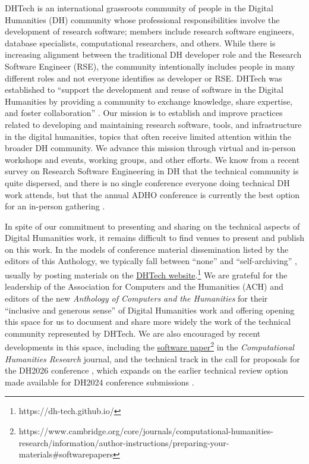 \documentclass[final]{anthology-ch} %
\begin{document}
DHTech is an international grassroots community of people in the Digital Humanities (DH) community whose professional responsibilities involve the development of research software; members include research software engineers, database specialists, computational  researchers, and others.  While there is increasing alignment between the traditional DH developer role and the Research Software Engineer (RSE),  the community intentionally includes people in many different roles and not everyone identifies as developer or RSE. DHTech was established to ``support the development and reuse of software in the Digital Humanities by providing a community to exchange knowledge, share expertise, and foster collaboration'' \cite{dhtech_about_2023}.   Our mission is to establish and improve practices related to developing and maintaining research software, tools, and infrastructure in the digital humanities, topics that often receive limited attention within the broader DH community. We advance this mission through virtual and in-person workshops and events, working groups, and other efforts. We know from a recent survey on Research Software Engineering in DH that the technical community is quite dispersed, and there is no single conference everyone doing technical DH work attends, but that the annual ADHO conference is currently the best option for an in-person gathering  \cite{damerow_surveying_2025}.

In spite of our commitment to presenting and sharing on the technical aspects of Digital Humanities work, it remains difficult to find venues to present and publish on this work. In the models of conference material dissemination listed by the editors of this Anthology, we typically fall between ``none'' and ``self-archiving''  \cite{10.63744@rWDzgqfDLYNm},  usually by posting materials on the \href{https://dh-tech.github.io/}{DHTech website}.\footnote{https://dh-tech.github.io/} We are grateful for the leadership of the Association for Computers and the Humanities (ACH) and editors of the new \textit{Anthology of Computers and the Humanities} for their ``inclusive and generous sense'' of Digital Humanities work \cite{10.63744@rWDzgqfDLYNm} and offering opening this space for us to document and share more widely the work of the technical community represented by DHTech.  We are also encouraged by recent developments in this space, including the \href{https://www.cambridge.org/core/journals/computational-humanities-research/information/author-instructions/preparing-your-materials#softwarepapers}{software paper}\footnote{https://www.cambridge.org/core/journals/computational-humanities-research/information/author-instructions/preparing-your-materials\#softwarepapers } in the \textit{Computational Humanities Research} journal, and the technical track in the call for proposals for the DH2026 conference \cite{noauthor_cfp_nodate}, which expands on the earlier technical review option made available for DH2024 conference submissions \cite{noauthor_call_nodate}.
\end{document}
